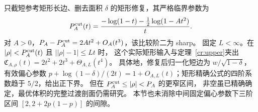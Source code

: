 \begin{remark}[非空与体积匹配之间的窄区]\label{cr:transition}
只截短参考矩形长边、删去面积 $\delta$ 的矩形修复，其严格临界参数为
\[
 P_A^{\rm cut}(t)=\frac{-\log(1-t)-\frac12\log(1-At^2)}t.
\]
对 $A>0$，$P_A-P_A^{\rm cut}=2At^2+O_A(t^3)$，该比较阶二为 sharp。
固定 $L<\infty$。在 $|\rho|<P_A^{\rm cut}(t)$ 且 $\big||\rho|-1\big|\le Lt$ 时，
这个实际矩形输入与定理~\ref{cr:upper}夹出
$\mathfrak C_{A,\rho}(t)=2t^2+2t^3+\Theta_{A,L}(t^4)$。
具体地，修复后归一化短边为 $w/\sqrt{1-\delta}$，有效偏心参数
$p+\log(1-\delta)/(2t)=1+O_{A,L}(t)$；矩形精确公式的四阶系数趋于 $5/2$，给出正下界。
但在 $P_A^{\rm cut}\le|\rho|<P_A$ 的更窄区间，
非空虽已精确确定，最优体积的完整过渡剖面仍需研究。
本节也未消除中间固定偏心参数下三阶区间 $[2,2+2p(1-p)]$ 的间隙。
\end{remark}
